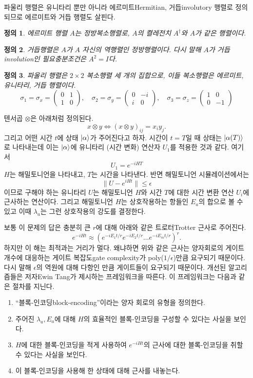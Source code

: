\documentclass[a4paper,atbegshi,chapter]{oblivoir}
\newtheorem{defn}{정의}[chapter]
\begin{document}
파울리 행렬은 유니타리 뿐만 아니라 에르미트{\tiny Hermitian},
거듭{\tiny involutory} 행렬로 정의되므로 에르미트와 거듭 행렬도 살핀다.
\begin{defn}
  에르미트 행렬 $A$는 정방복소행렬로, $A$의 켤레전치 $A^{\dagger}$와 $A$가
  같은 행렬이다.
\end{defn}
\begin{defn}
  거듭행렬은 $A$가 $A$ 자신의 역행렬인 정방행렬이다. 다시 말해 $A$가 거듭{\tiny
  involution}인 필요충분조건은 $A^2=I$다.
\end{defn}
\begin{defn}
  파울리 행렬은 $2\times2$ 복소행렬 세 개의 집합으로, 이들 복소행렬은 에르미트,
  유니타리, 거듭 행렬이다. 
  \[
    \sigma_1 = \sigma_x = \begin{pmatrix}0 & 1 \\ 1 & 0\end{pmatrix},\quad
    \sigma_2 = \sigma_y = \begin{pmatrix} 0 & -i \\ i & 0\end{pmatrix},\quad
    \sigma_3 = \sigma_z = \begin{pmatrix}1 & 0 \\ 0 & -1\end{pmatrix}
  \]
\end{defn}
텐서곱 $\otimes$은 아래처럼 정의된다.
\[
  x\otimes y \iff (x\otimes y)_{ij}=x_iy_j.
\]
그리고 어떤 시간 $t$에 상태 $\ket{\alpha}$가 주어진다고 하자. 시간이 $t=T$일 때
상태는 $\ket{\alpha(T)}$로 나타내는데 이는 $\ket{\alpha}$에 유니타리 (시간 변화) 
연산자 $U_1$를 적용한 것과 같다. 여기서 
\[
  U_1 = e^{-iHT}
\]
$H$는 해밀토니언을 나타내고, $T$는 시간을 나타낸다. 반면 해밀토니언
시뮬레이션에서는
\[
  \|U-e^{iHt}\|\leq\epsilon
\]
이므로 구해야 하는 유니타리 $U$는 해밀토니언 $H$와 시간 $T$에 대한 시간 변환
연산 $U_i$에 근사하는 연산이다. 그리고 해밀토니언 $H$는 상호작용하는 항들인
$E_a$의 합으로 볼 수 있고 이때 $\lambda_a$는 그런 상호작용의 강도를 결정한다.

보통 이 문제의 답은 충분히 큰 $r$에 대해 아래와 같은 트로터{\tiny Trotter}
근사로 주어진다.
\[
  e^{-iHt}\approx (e^{-iE_1t/r}e^{-iE_2t/r}\ldots e^{-iE_mt/r})^r.
\]
하지만 이 해는 최적과는 거리가 멀다. 왜냐하면 위와 같은 근사는 양자회로의
게이트 개수에 대응하는 게이트 복잡도{\tiny gate complexity}가 
poly($1/\epsilon$)만큼 요구되기 때문이다. 다시 말해 $\epsilon$의 역원에 대해
다항인 만큼 게이트들이 요구되기 때문이다. 개선된 알고리즘들은 저자{\tiny Ewin
Tang}가 제시하는 프레임워크을 따른다.  이 프레임워크는 다음과 같은 절차를 지닌다.
\begin{enumerate}[label=(\roman*)]
  \item ``블록-인코딩{\tiny block-encoding}''이라는 양자 회로의 유형을 정의한다.
  \item 주어진 $\lambda_a, E_a$에 대해 $H$의 효율적인 블록-인코딩을 구성할 수
    있다는 사실을 보인다.
  \item $H$에 대한 블록-인코딩을 적게 사용하여 $e^{-iHt}$의 근사에 대한
    블록-인코딩을 취할 수 있다는 사실을 보인다.
  \item 이 블록-인코딩을 사용해 한 상태에 대해 근사를 내놓는다.
\end{enumerate}
\end{document}
